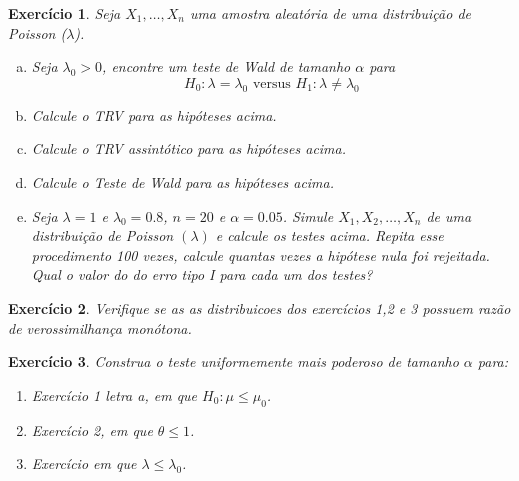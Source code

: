 \documentclass[letter,11pt]{article}
\newtheorem{exer}{Exercício}
\begin{document}
\begin{exer} \rm
Seja $X_1, \ldots, X_n$ uma amostra aleatória de uma distribuição de Poisson ($\lambda$).
  \begin{enumerate}[a)]
    \item Seja $\lambda_0>0$, encontre um teste de Wald de tamanho $\alpha$ para
$$
H_0: \lambda=\lambda_0  \mbox{ versus } H_1: \lambda \neq \lambda_0
$$

    \item Calcule o TRV para as hipóteses acima.

    \item Calcule o TRV assintótico para as hipóteses acima. 
  
    \item Calcule o Teste de Wald para as hipóteses acima.

    \item Seja $\lambda=1$ e $\lambda_0=0.8$, $n=20$ e $\alpha=0.05$. Simule $X_1, X_2, \ldots, X_n$ de uma distribuição de Poisson $(\lambda)$ e calcule os testes acima. Repita esse procedimento 100 vezes, calcule quantas vezes a hipótese nula foi rejeitada. Qual o valor do do erro tipo I para cada um dos testes?
\end{enumerate}
\end{exer}


\begin{exer} \rm
Verifique se as as distribuicoes dos exercícios 1,2 e 3 possuem razão de verossimilhança monótona. 
\end{exer}


\begin{exer} \rm
Construa o teste uniformemente mais poderoso de tamanho $\alpha$ para:

  \begin{enumerate}
    \item Exercício 1 letra a, em que $H_0: \mu \leq \mu_0$.
    
    \item Exercício 2, em que $\theta \leq 1$.
    
    \item Exercício em que $\lambda \leq \lambda_0$.
  \end{enumerate}
\end{exer}
\end{document}
